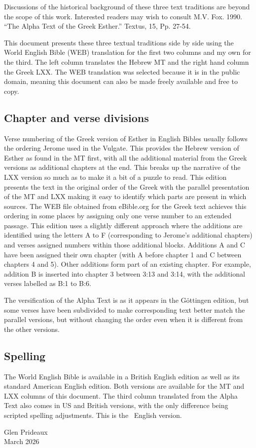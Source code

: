 {Discussions of the historical background of these three text traditions are beyond the scope of this work. Interested readers may wish to consult M.V. Fox. 1990. “The Alpha Text of the Greek Esther.” Textus, 15, Pp. 27-54.

This document presents these three textual traditions side by side using the World English Bible (WEB) translation for the first two columns and my own for the third. The left column translates the Hebrew MT and the right hand column the Greek LXX. The WEB translation was selected because it is in the public domain, meaning this document can also be made freely available and free to copy.

\subsection*{Chapter and verse divisions}

Verse numbering of the Greek version of Esther in English Bibles usually follows the ordering Jerome used in the Vulgate. This provides the Hebrew version of Esther as found in the MT first, with all the additional material from the Greek versions as additional chapters at the end. This breaks up the narrative of the LXX version so much as to make it a bit of a puzzle to read. This edition presents the text in the original order of the Greek with the parallel presentation of the MT and LXX making it easy to identify which parts are present in which sources. The WEB file obtained from eBible.org for the Greek text achieves this ordering in some places by assigning only one verse number to an extended passage. This edition uses a slightly different approach where the additions are identified using the letters A to F (corresponding to Jerome's additional chapters) and verses assigned numbers within those additional blocks. Additions A and C have been assigned their own chapter (with A before chapter 1 and C between chapters 4 and 5). Other additions form part of an existing chapter. For example, addition B is inserted into chapter 3 between 3:13 and 3:14, with the additional verses labelled as B:1 to B:6.

The versification of the Alpha Text is as it appears in the Göttingen edition, but some verses have been subdivided to make corresponding text better match the parallel versions, but without changing the order even when it is different from the other versions.

\subsection*{Spelling}
The World English Bible is available in a British English edition as well as its standard American English edition. Both versions are available for the MT and LXX columns of this document. The third column translated from the Alpha Text also comes in US and British versions, with the only difference being scripted spelling adjustments. This is the \fi\ English version.

\bigskip
\noindent Glen Prideaux\\
March 2026
}
